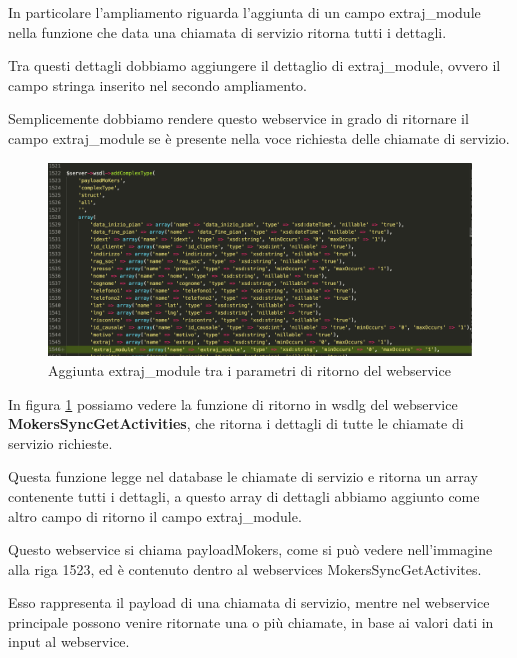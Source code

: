 \begin{flushleft}
	
	In particolare l'ampliamento riguarda l'aggiunta di un campo extraj\_module nella funzione che data una chiamata di servizio ritorna tutti i dettagli.
	
	Tra questi dettagli dobbiamo aggiungere il dettaglio di extraj\_module, ovvero il campo stringa inserito nel secondo ampliamento.
	
	Semplicemente dobbiamo rendere questo webservice in grado di ritornare il campo extraj\_module se è presente nella voce richiesta delle chiamate di servizio.
	
\end{flushleft}
\newspace
\begin{figure}[!h] 
	\centering
	\includegraphics[scale = 0.3]{immagini/webservices/ampliamenti/3ampl__types_getCisa.png}
	\caption{Aggiunta extraj\_module tra i parametri di ritorno del webservice}
	\label{fig:5-8}
\end{figure}
\newspace
\begin{flushleft}
	In figura \ref{fig:5-8} possiamo vedere la funzione di ritorno in \gls{wsdlg} del webservice \textbf{MokersSyncGetActivities}, che ritorna i dettagli di tutte le chiamate di servizio richieste. 
	\newspace
	
	Questa funzione legge nel database le chiamate di servizio e ritorna un array contenente tutti i dettagli, a questo array di dettagli abbiamo aggiunto come altro campo di ritorno il campo extraj\_module.
	
	\newspace
	
	Questo webservice si chiama payloadMokers, come si può vedere nell'immagine alla riga 1523, ed è contenuto dentro al webservices MokersSyncGetActivites.
	\newspace
	
	Esso rappresenta il payload di una chiamata di servizio, mentre nel webservice principale possono venire ritornate una o più chiamate, in base ai valori dati in input al webservice.
\end{flushleft}

